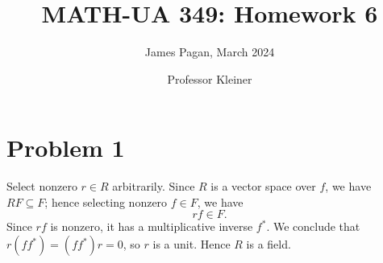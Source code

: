 \documentclass[11pt]{article}
\title{MATH-UA 349: Homework 6}
\author{James Pagan, March 2024}
\date{Professor Kleiner}
\begin{document}
\maketitle
\tableofcontents
\newpage


\section{Problem 1}

Select nonzero $r \in R$ arbitrarily. Since $R$ is a vector space over $f$, we have $RF \subseteq F$; hence selecting nonzero $f \in F$, we have
\[
  rf \in F.
\]
Since $rf$ is nonzero, it has a multiplicative inverse $f^{\ast}$. We conclude that $r(f f^{\ast}) = (f f^{\ast})r = 0$, so $r$ is a unit. Hence $R$ is a field.

\end{document}
